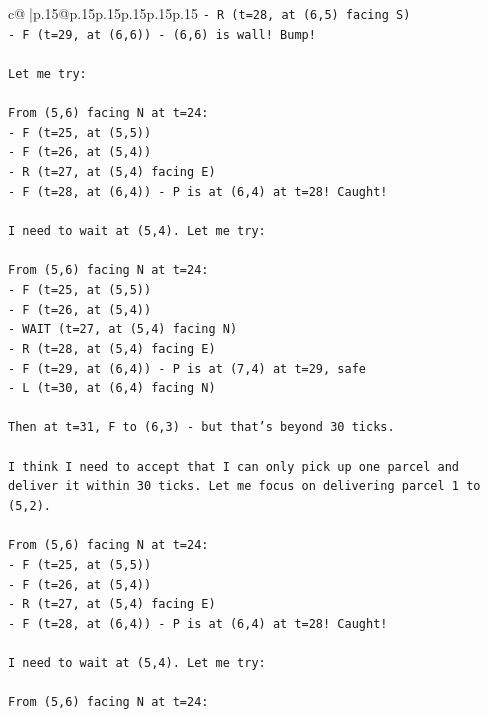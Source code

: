\documentclass{article}
\begin{document}
{\begin{supertabular}{c@{$\;$}|p{.15\linewidth}@{}p{.15\linewidth}p{.15\linewidth}p{.15\linewidth}p{.15\linewidth}p{.15\linewidth}}
{{{\texttt{{-} R (t=28, at (6,5) facing S)} \\
\texttt{{-} F (t=29, at (6,6)) {-} (6,6) is wall! Bump!} \\
\\ 
\texttt{Let me try:} \\
\\ 
\texttt{From (5,6) facing N at t=24:} \\
\texttt{{-} F (t=25, at (5,5))} \\
\texttt{{-} F (t=26, at (5,4))} \\
\texttt{{-} R (t=27, at (5,4) facing E)} \\
\texttt{{-} F (t=28, at (6,4)) {-} P is at (6,4) at t=28! Caught!} \\
\\ 
\texttt{I need to wait at (5,4). Let me try:} \\
\\ 
\texttt{From (5,6) facing N at t=24:} \\
\texttt{{-} F (t=25, at (5,5))} \\
\texttt{{-} F (t=26, at (5,4))} \\
\texttt{{-} WAIT (t=27, at (5,4) facing N)} \\
\texttt{{-} R (t=28, at (5,4) facing E)} \\
\texttt{{-} F (t=29, at (6,4)) {-} P is at (7,4) at t=29, safe} \\
\texttt{{-} L (t=30, at (6,4) facing N)} \\
\\ 
\texttt{Then at t=31, F to (6,3) {-} but that's beyond 30 ticks.} \\
\\ 
\texttt{I think I need to accept that I can only pick up one parcel and deliver it within 30 ticks. Let me focus on delivering parcel 1 to (5,2).} \\
\\ 
\texttt{From (5,6) facing N at t=24:} \\
\texttt{{-} F (t=25, at (5,5))} \\
\texttt{{-} F (t=26, at (5,4))} \\
\texttt{{-} R (t=27, at (5,4) facing E)} \\
\texttt{{-} F (t=28, at (6,4)) {-} P is at (6,4) at t=28! Caught!} \\
\\ 
\texttt{I need to wait at (5,4). Let me try:} \\
\\ 
\texttt{From (5,6) facing N at t=24:} \\
}}}
\end{supertabular}}
\end{document}
